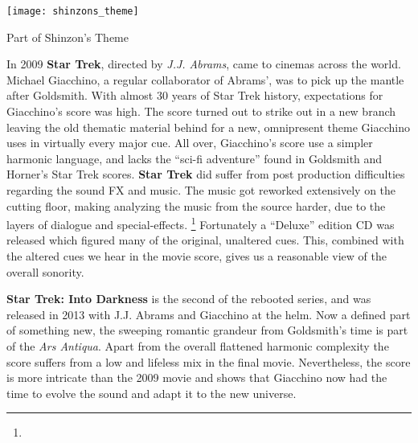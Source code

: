 \begin{marginfigure}
\texttt{[image: shinzons\_theme]}
	\caption{Part of Shinzon's Theme}
	\label{shinzons_theme}
\end{marginfigure}

In 2009 \textbf{Star Trek}, directed by \textit{J.J. Abrams}, came to cinemas across the world. Michael Giacchino, a regular collaborator of Abrams', was to pick up the mantle after Goldsmith. With almost 30 years of Star Trek history, expectations for Giacchino's score was high. The score turned out to strike out in a new branch leaving the old thematic material behind for a new, omnipresent theme Giacchino uses in virtually every major cue. All over, Giacchino's score use a simpler harmonic language, and lacks the ``sci-fi adventure'' found in Goldsmith and Horner's Star Trek scores. \textbf{Star Trek} did suffer from post production difficulties regarding the sound FX and music. The music got reworked extensively on the cutting floor, making analyzing the music from the source harder, due to the layers of dialogue and special-effects.
\footnote{
}
Fortunately a ``Deluxe'' edition CD was released which figured many of the original, unaltered cues. This, combined with the altered cues we hear in the movie score, gives us a reasonable view of the overall sonority.

\textbf{Star Trek: Into Darkness} is the second of the rebooted series, and was released in 2013 with J.J. Abrams and Giacchino at the helm. Now a defined part of something new, the sweeping romantic grandeur from Goldsmith's time is part of the \textit{Ars Antiqua}. Apart from the overall flattened harmonic complexity the score suffers from a low and lifeless mix in the final movie. Nevertheless, the score is more intricate than the 2009 movie and shows that Giacchino now had the time to evolve the sound and adapt it to the new universe. 

